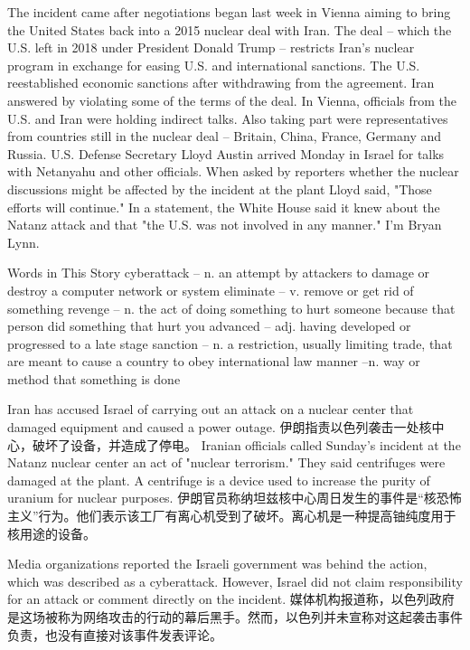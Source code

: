 The incident came after negotiations began last week in Vienna aiming to bring the United States back into a 2015 nuclear deal with Iran. The deal -- which the U.S. left in 2018 under President Donald Trump -- restricts Iran's nuclear program in exchange for easing U.S. and international sanctions.
The U.S. reestablished economic sanctions after withdrawing from the agreement. Iran answered by violating some of the terms of the deal.
In Vienna, officials from the U.S. and Iran were holding indirect talks. Also taking part were representatives from countries still in the nuclear deal -- Britain, China, France, Germany and Russia.
U.S. Defense Secretary Lloyd Austin arrived Monday in Israel for talks with Netanyahu and other officials. When asked by reporters whether the nuclear discussions might be affected by the incident at the plant Lloyd said, "Those efforts will continue."
In a statement, the White House said it knew about the Natanz attack and that "the U.S. was not involved in any manner."
I'm Bryan Lynn.

\begin{messagebox}
Words in This Story
cyberattack – n. an attempt by attackers to damage or destroy a computer network or system
eliminate – v. remove or get rid of something
revenge – n. the act of doing something to hurt someone because that person did something that hurt you
advanced – adj. having developed or progressed to a late stage
sanction – n. a restriction, usually limiting trade, that are meant to cause a country to obey international law
manner –n. way or method that something is done
\end{messagebox}

Iran has accused Israel of carrying out an attack on a nuclear center that damaged equipment and caused a power outage.
伊朗指责以色列袭击一处核中心，破坏了设备，并造成了停电。
Iranian officials called Sunday's incident at the Natanz nuclear center an act of "nuclear terrorism." They said centrifuges were damaged at the plant. A centrifuge is a device used to increase the purity of uranium for nuclear purposes.
伊朗官员称纳坦兹核中心周日发生的事件是“核恐怖主义”行为。他们表示该工厂有离心机受到了破坏。离心机是一种提高铀纯度用于核用途的设备。

Media organizations reported the Israeli government was behind the action, which was described as a cyberattack. However, Israel did not claim responsibility for an attack or comment directly on the incident.
媒体机构报道称，以色列政府是这场被称为网络攻击的行动的幕后黑手。然而，以色列并未宣称对这起袭击事件负责，也没有直接对该事件发表评论。

